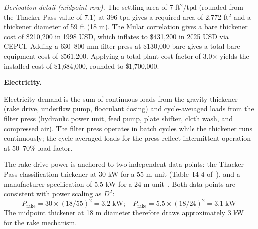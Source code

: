 \noindent \textit{Derivation detail (midpoint row).} The settling area of 7 ft$^2$/tpd (rounded from the Thacker Pass value of 7.1) at 396 tpd gives a required area of 2,772 ft$^2$ and a thickener diameter of 59 ft (18 m). The Mular correlation gives a bare thickener cost of \$210,200 in 1998 USD, which inflates to \$431,200 in 2025 USD via CEPCI. Adding a 630--800 mm filter press at \$130,000 bare gives a total bare equipment cost of \$561,200. Applying a total plant cost factor of 3.0$\times$ yields the installed cost of \$1,684,000, rounded to \$1,700,000.

\medskip
\noindent\textbf{Electricity.}\quad

Electricity demand is the sum of continuous loads from the gravity thickener (rake drive, underflow pump, flocculant dosing) and cycle-averaged loads from the filter press (hydraulic power unit, feed pump, plate shifter, cloth wash, and compressed air). The filter press operates in batch cycles while the thickener runs continuously; the cycle-averaged loads for the press reflect intermittent operation at 50--70\% load factor.

The rake drive power is anchored to two independent data points: the Thacker Pass classification thickener at 30 kW for a 55 m unit (Table~14-4 of~\citet{sgscanadaincSK1300Technical2024}), and a manufacturer specification of 5.5 kW for a 24 m unit~\cite{jinhaominingHotItemLarge}. Both data points are consistent with power scaling as $D^2$:
\[
	P_{\text{rake}} = 30 \times (18/55)^2 = 3.2 \;\text{kW}; \quad P_{\text{rake}} = 5.5 \times (18/24)^2 = 3.1 \;\text{kW}
\]
The midpoint thickener at 18 m diameter therefore draws approximately 3 kW for the rake mechanism.

